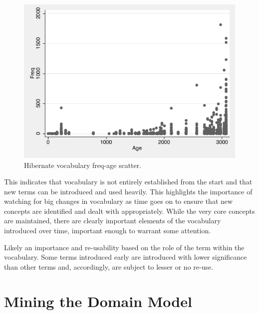 \begin{figure}[t]
\centering
\includegraphics[width=\textwidth]{Figures/Vocab-HibernateFrequencyAge.pdf}
\caption{Hibernate vocabulary freq-age scatter.}
\label{fig:vocab-freqage-hibernate}
\end{figure}

% 
% 

This indicates that vocabulary is not entirely established from the start and that new terms can be introduced and used heavily. This highlights the importance of watching for big changes in vocabulary as time goes on to ensure that new concepts are identified and dealt with appropriately. While the very core concepts are maintained, there are clearly important elements of the vocabulary introduced over time, important enough to warrant some attention.

Likely an importance and re-usability based on the role of the term within the vocabulary. Some terms introduced early are introduced with lower significance than other terms and, accordingly, are subject to lesser or no re-use.


\section{Mining the Domain Model} %
\label{sec:mining_the_domain_model}

